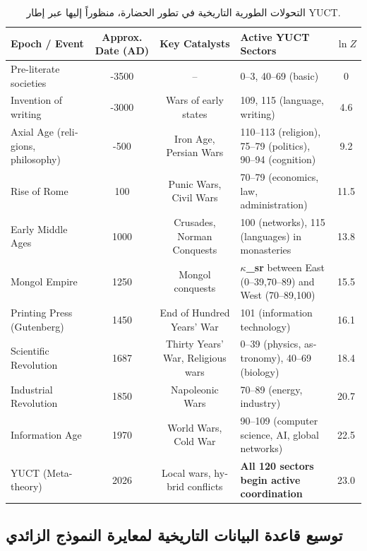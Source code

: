 \documentclass[11pt,a4paper]{article}
\begin{document}
	\begin{table}[htbp]
		\begin{otherlanguage}{english}
			\centering
			\caption{Historical phase transitions in the evolution of civilization, viewed through the YUCT framework.}
			\label{tab:historical-transitions}
			\scriptsize  
			\begin{tabular}{p{2.2cm} c c p{5.5cm} c}
				\toprule
				\textbf{Epoch / Event} & \textbf{Approx. Date (AD)} & \textbf{Key Catalysts} & \textbf{Active YUCT Sectors} & $\ln Z$ \\
				\midrule
				Pre-literate societies & -3500 & – & 0–3, 40–69 (basic) & 0 \\
				Invention of writing & -3000 & Wars of early states & 109, 115 (language, writing) & 4.6 \\
				Axial Age (religions, philosophy) & -500 & Iron Age, Persian Wars & 110–113 (religion), 75–79 (politics), 90–94 (cognition) & 9.2 \\
				Rise of Rome & 100 & Punic Wars, Civil Wars & 70–79 (economics, law, administration) & 11.5 \\
				Early Middle Ages & 1000 & Crusades, Norman Conquests & 100 (networks), 115 (languages) in monasteries & 13.8 \\
				Mongol Empire & 1250 & Mongol conquests & \textbf{$\kappa$\_sr} between East (0–39,70–89) and West (70–89,100) & 15.5 \\
				Printing Press (Gutenberg) & 1450 & End of Hundred Years' War & 101 (information technology) & 16.1 \\
				Scientific Revolution & 1687 & Thirty Years' War, Religious wars & 0–39 (physics, astronomy), 40–69 (biology) & 18.4 \\
				Industrial Revolution & 1850 & Napoleonic Wars & 70–89 (energy, industry) & 20.7 \\
				Information Age & 1970 & World Wars, Cold War & 90–109 (computer science, AI, global networks) & 22.5 \\
				YUCT (Meta-theory) & 2026 & Local wars, hybrid conflicts & \textbf{All 120 sectors begin active coordination} & 23.0 \\
				\bottomrule
			\end{tabular}
		\end{otherlanguage}
		\caption{التحولات الطورية التاريخية في تطور الحضارة، منظوراً إليها عبر إطار YUCT.}
	\end{table}
	
	\subsection{توسيع قاعدة البيانات التاريخية لمعايرة النموذج الزائدي}
	\label{subsec:historical-data}
	
\end{document}
